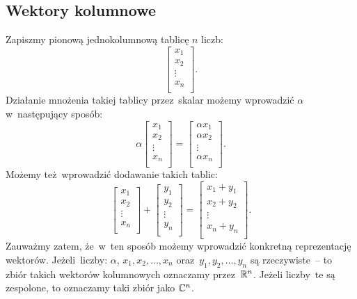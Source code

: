 \subsection{Wektory kolumnowe}
Zapiszmy pionową jednokolumnową tablicę $n$ liczb:
$$
	\begin{bmatrix}
		x_1    \\
		x_2    \\
		\vdots \\
		x_{n}  \\
	\end{bmatrix}.
$$
Działanie mnożenia takiej tablicy przez~skalar możemy wprowadzić $\alpha$ w~następujący sposób:
$$
	\alpha
	\begin{bmatrix}
		x_1    \\
		x_2    \\
		\vdots \\
		x_{n}  \\
	\end{bmatrix}=
	\begin{bmatrix}
		\alpha x_1   \\
		\alpha x_2   \\
		\vdots       \\
		\alpha x_{n} \\
	\end{bmatrix}.
$$
Możemy też~wprowadzić dodawanie takich tablic:
$$
	\begin{bmatrix}
		x_1    \\
		x_2    \\
		\vdots \\
		x_{n}  \\
	\end{bmatrix} +
	\begin{bmatrix}
		y_1    \\
		y_2    \\
		\vdots \\
		y_{n}  \\
	\end{bmatrix} =
	\begin{bmatrix}
		x_1 + y_1     \\
		x_2 + y_2     \\
		\vdots        \\
		x_{n} + y_{n} \\
	\end{bmatrix}.
$$
Zauważmy zatem, że~w~ten sposób możemy wprowadzić
konkretną reprezentację wektorów. Jeżeli~liczby: $\alpha$,
$x_1, x_2, \ldots, x_{n}$ oraz~$y_1, y_2, \ldots, y_{n}$ są rzeczywiste~-- to zbiór takich wektorów kolumnowych oznaczamy przez~$\mathbb{R}^n$.
Jeżeli liczby~te są zespolone, to oznaczamy taki zbiór jako
$\mathbb{C}^n$.

